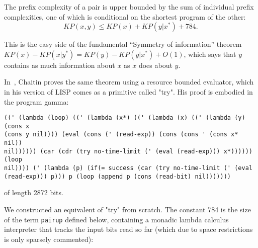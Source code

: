 \documentclass{article}
\begin{document}
The prefix complexity of a pair is upper bounded by the sum of
individual prefix complexities, one of which is conditional on
the shortest program of the other:
\[  KP(x,y) \leq KP(x) + KP(y|x^{\ast}) + 784. \]

This is the easy side of the fundamental ``Symmetry of information''
theorem $KP(x)-KP(x|y^{\ast}) = KP(y)-KP(y|x^{\ast}) + O(1)$, which
says that $y$ contains as much information about $x$ as $x$ does about $y$.

In~\cite{ch01}, Chaitin proves the same theorem using a resource bounded evaluator,
which in his version of LISP comes as a primitive called "try".
His proof is embodied in the program gamma:

{\small
\begin{verbatim}
((' (lambda (loop) ((' (lambda (x*) ((' (lambda (x) ((' (lambda (y) (cons x
(cons y nil)))) (eval (cons (' (read-exp)) (cons (cons ' (cons x* nil))
nil)))))) (car (cdr (try no-time-limit (' (eval (read-exp))) x*)))))) (loop
nil)))) (' (lambda (p) (if(= success (car (try no-time-limit (' (eval
(read-exp))) p))) p (loop (append p (cons (read-bit) nil)))))))
\end{verbatim}
}

of length 2872 bits.

We constructed an equivalent of "try" from scratch.
The constant 784 is the size of the term {\tt pairup} defined below,
containing a monadic lambda calculus interpreter that tracks the input bits read so far
(which due to space restrictions is only sparsely commented):
\end{document}
